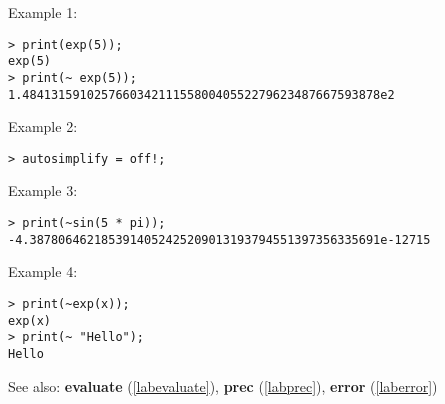 \noindent Example 1: 
\begin{center}\begin{minipage}{15cm}\begin{Verbatim}[frame=single]
> print(exp(5));
exp(5)
> print(~ exp(5));
1.48413159102576603421115580040552279623487667593878e2
\end{Verbatim}
\end{minipage}\end{center}
\noindent Example 2: 
\begin{center}\begin{minipage}{15cm}\begin{Verbatim}[frame=single]
> autosimplify = off!;
\end{Verbatim}
\end{minipage}\end{center}
\noindent Example 3: 
\begin{center}\begin{minipage}{15cm}\begin{Verbatim}[frame=single]
> print(~sin(5 * pi));
-4.3878064621853914052425209013193794551397356335691e-12715
\end{Verbatim}
\end{minipage}\end{center}
\noindent Example 4: 
\begin{center}\begin{minipage}{15cm}\begin{Verbatim}[frame=single]
> print(~exp(x));
exp(x)
> print(~ "Hello");
Hello
\end{Verbatim}
\end{minipage}\end{center}
See also: \textbf{evaluate} (\ref{labevaluate}), \textbf{prec} (\ref{labprec}), \textbf{error} (\ref{laberror})
